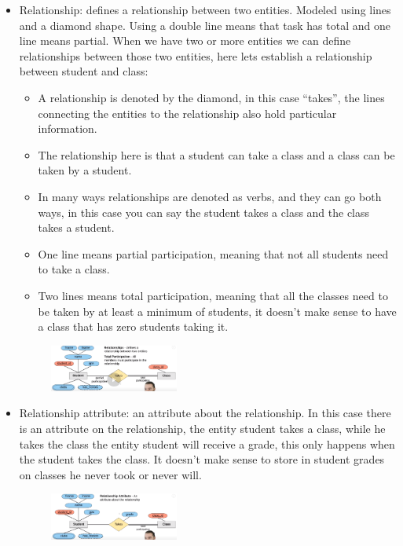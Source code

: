 \begin{itemize}
\begin{figure}[H]
        \end{figure}
    \item Relationship: defines a relationship between two entities. Modeled using lines and a diamond shape. Using a double line means that task has total and one line means partial. When we have two or more entities we can define relationships between those two entities, here lets establish a relationship between student and class:
        \begin{itemize}
            \item A relationship is denoted by the diamond, in this case ``takes'', the lines connecting the entities to the relationship also hold particular information. 
            \item The relationship here is that a student can take a class and a class can be taken by a student.
            \item In many ways relationships are denoted as verbs, and they can go both ways, in this case you can say the student takes a class and the class takes a student.
            \item One line means partial participation, meaning that not all students need to take a class.
            \item Two lines means total participation, meaning that all the classes need to be taken by at least a minimum of students, it doesn't make sense to have a class that has zero students taking it.
        \end{itemize}
        \begin{figure}[H]
            \centering
            \includegraphics[width=0.4\textwidth]{./Figs/2020-12-23-23-41-52.png}
        \end{figure}
    \item Relationship attribute: an attribute about the relationship. In this case there is an attribute on the relationship, the entity student takes a class, while he takes the class the entity student will receive a grade, this only happens when the student takes the class. It doesn't make sense to store in student grades on classes he never took or never will.
        \begin{figure}[H]
            \centering
            \includegraphics[width=0.4\textwidth]{./Figs/2020-12-23-23-47-13.png}

\end{figure}
\end{itemize}
